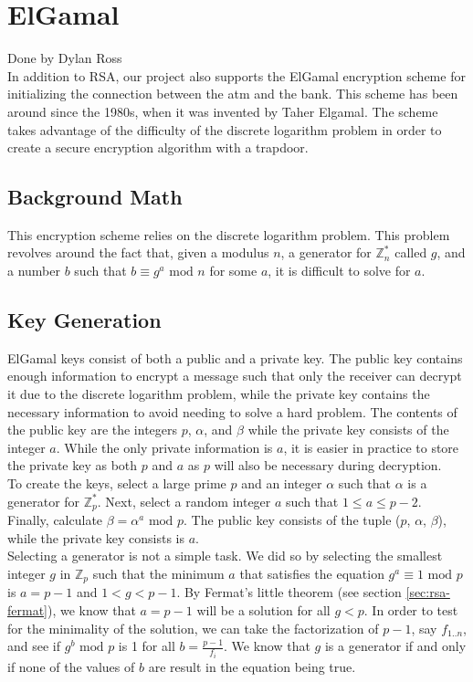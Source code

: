 \section{ElGamal}\label{sec:elgamal}
Done by Dylan Ross\\

	\medskip
	In addition to RSA, our project also supports the ElGamal encryption scheme for initializing the connection between the atm and the bank. This scheme has been around since the 1980s, when it was
	invented by Taher Elgamal. The scheme takes advantage of the difficulty of the discrete logarithm problem in order to create a secure encryption algorithm with a trapdoor.

	\subsection{Background Math}\label{sec:elgamal-background}
		This encryption scheme relies on the discrete logarithm problem. This problem revolves around the fact that, given a modulus $n$, a generator for $\mathbb{Z}_n^*$ called $g$, and a number
		$b$ such that $b\equiv g^a\text{ mod }n$ for some $a$, it is difficult to solve for $a$.

	\subsection{Key Generation}\label{sec:elgamel-keys}
		ElGamal keys consist of both a public and a private key. The public key contains enough information to encrypt a message such that only the receiver can decrypt it due to the discrete
		logarithm problem, while the private key contains the necessary information to avoid needing to solve a hard problem. The contents of the public key are the integers $p$, $\alpha$, and
		$\beta$ while the private key consists of the integer $a$. While the only private information is $a$, it is easier in practice to store the private key as both $p$ and $a$ as $p$ will
		also be necessary during decryption.\\

		To create the keys, select a large prime $p$ and an integer $\alpha$ such that $\alpha$ is a generator for $\mathbb{Z}_p^*$. Next, select a random integer $a$ such that $1\le a\le p-2$.
		Finally, calculate $\beta=\alpha^a\text{ mod }p$. The public key consists of the tuple ($p$, $\alpha$, $\beta$), while the private key consists is $a$.\\

		Selecting a generator is not a simple task. We did so by selecting the smallest integer $g$ in $\mathbb{Z}_p$ such that the minimum $a$ that satisfies the equation $g^a\equiv1\text{ mod }p$
		is $a=p-1$ and $1<g<p-1$. By Fermat's little theorem (see section \ref{sec:rsa-fermat}), we know that $a=p-1$ will be a solution for all $g<p$. In order to test for the minimality of
		the solution, we can take the factorization of $p-1$, say $f_{1..n}$, and see if $g^b\text{ mod }p$ is 1 for all $b=\frac{p-1}{f_i}$. We know that $g$ is a generator if and only if
		none of the values of $b$ are result in the equation being true.

